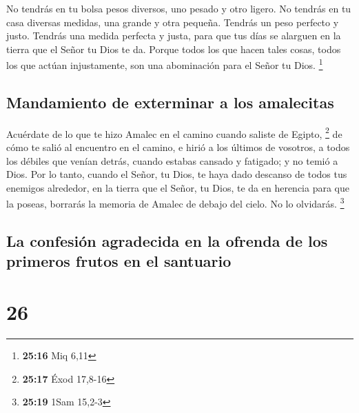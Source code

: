  No tendrás en tu bolsa pesos diversos, uno pesado y otro
ligero.  No tendrás en tu casa diversas medidas, una
grande y otra pequeña.  Tendrás un peso perfecto y justo.
Tendrás una medida perfecta y justa, para que tus días se alarguen en la
tierra que el Señor tu Dios te da.  Porque todos los que
hacen tales cosas, todos los que actúan injustamente, son una
abominación para el Señor tu Dios. \footnote{\textbf{25:16} Miq 6,11}

\hypertarget{mandamiento-de-exterminar-a-los-amalecitas}{%
\subsection{Mandamiento de exterminar a los
amalecitas}\label{mandamiento-de-exterminar-a-los-amalecitas}}

 Acuérdate de lo que te hizo Amalec en el camino cuando
saliste de Egipto, \footnote{\textbf{25:17} Éxod 17,8-16}
 de cómo te salió al encuentro en el camino, e hirió a
los últimos de vosotros, a todos los débiles que venían detrás, cuando
estabas cansado y fatigado; y no temió a Dios.  Por lo
tanto, cuando el Señor, tu Dios, te haya dado descanso de todos tus
enemigos alrededor, en la tierra que el Señor, tu Dios, te da en
herencia para que la poseas, borrarás la memoria de Amalec de debajo del
cielo. No lo olvidarás. \footnote{\textbf{25:19} 1Sam 15,2-3}

\hypertarget{la-confesiuxf3n-agradecida-en-la-ofrenda-de-los-primeros-frutos-en-el-santuario}{%
\subsection{La confesión agradecida en la ofrenda de los primeros frutos
en el
santuario}\label{la-confesiuxf3n-agradecida-en-la-ofrenda-de-los-primeros-frutos-en-el-santuario}}

\hypertarget{section-25}{%
\section{26}\label{section-25}}


